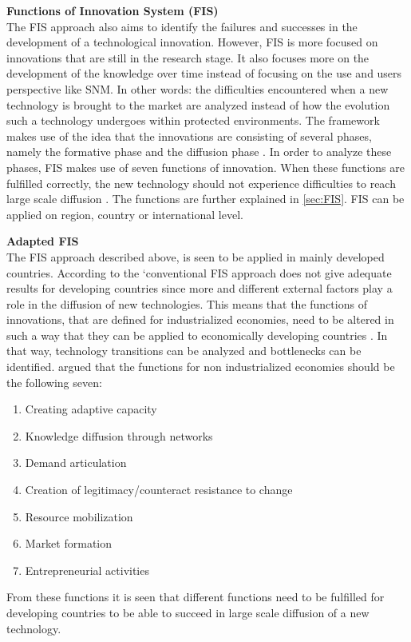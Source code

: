 \textbf{Functions of Innovation System (FIS)}\\
The FIS approach also aims to identify the failures and successes in the development of a technological innovation. However, FIS is more focused on innovations that are still in the research stage. It also focuses more on the development of the knowledge over time instead of focusing on the use and users perspective like SNM. In other words: the difficulties encountered when a new technology is brought to the market are analyzed \citep{Negro2007} instead of how the evolution such a technology undergoes within protected environments. The framework makes use of the idea that the innovations are consisting of several phases, namely the formative phase and the diffusion phase \citep{Negro2007}. In order to analyze these phases, FIS makes use of seven functions of innovation. When these functions are fulfilled correctly, the new technology should not experience difficulties to reach large scale diffusion \citep{Kamp2008}. The functions are further explained in \ref{sec:FIS}. FIS can be applied on region, country or international level. 

\textbf{Adapted FIS}\\
The FIS approach described above, is seen to be applied in mainly developed countries. According to \cite{alphen_hekkert_sark_2008} the `conventional FIS approach does not give adequate results for developing countries since more and different external factors play a role in the diffusion of new technologies. This means that the functions of innovations, that are defined for industrialized economies, need to be altered in such a way that they can be applied to economically developing countries  \citep{alphen_hekkert_sark_2008}. In that way, technology transitions can be analyzed and bottlenecks can be identified. \cite{alphen_hekkert_sark_2008} argued that the functions for non industrialized economies should be the following seven:
\begin{enumerate}
    \item Creating adaptive capacity
    \item Knowledge diffusion through networks
    \item Demand articulation
    \item Creation of legitimacy/counteract resistance to change
    \item Resource mobilization
    \item Market formation
    \item Entrepreneurial activities
\end{enumerate}
From these functions it is seen that different functions need to be fulfilled for developing countries to be able to succeed in large scale diffusion of a new technology. \\

